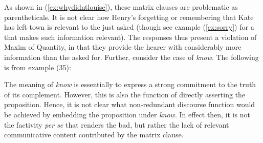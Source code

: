 \documentclass[output=paper]{langsci/langscibook}
\begin{document}
As shown in (\ref{ex:whydidntlouise}), these matrix clauses are problematic as parentheticals. %
It is not clear how Henry's forgetting or remembering that Kate has left town is relevant to the  just asked (though see example (\ref{ex:sorry}) for a  that makes such information relevant). The responses thus present a violation of  Maxim of Quantity, in that they provide the hearer with considerably more information than the  asked for. Further, consider the case of \textit{know}. The following is from  example (35): %



The meaning of \textit{know} is essentially to express a strong commitment to the truth of its complement. However, this is also the function of directly asserting the proposition. Hence, it is not clear what non-redundant discourse function would be achieved by embedding the proposition under \textit{know}. In effect then, it is not the factivity \textit{per se} that renders the  bad, but rather the lack of relevant communicative content contributed by the matrix clause. 
\end{document}
